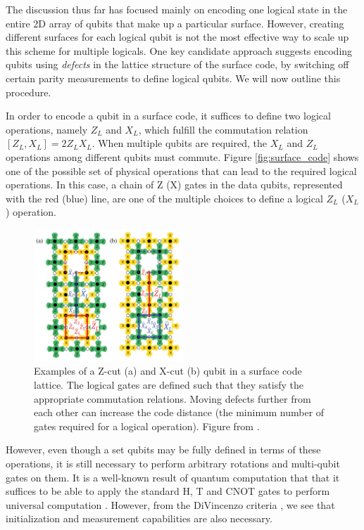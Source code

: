The discussion thus far has focused mainly on encoding one logical state in the
entire 2D array of qubits that make up a particular surface. However, creating
different surfaces for each logical qubit is not the most effective way to
scale up this scheme for multiple logicals. One key candidate approach suggests
encoding qubits using \textit{defects} in the lattice structure of the surface
code, by switching off certain parity measurements to define logical qubits. We
will now outline this procedure.

In order to encode a qubit in a surface code, it suffices to define two logical
operations, namely $Z_L$ and $X_L$, which fulfill the commutation relation
$[Z_L,X_L] = 2Z_LX_L$. When multiple qubits are required, the $X_L$ and $Z_L$
operations among different qubits must commute. Figure \ref{fig:surface_code}
shows one of the possible set of physical operations that can lead to the
required logical operations. In this case, a chain of Z (X) gates in the data
qubits, represented with the red (blue) line, are one of the multiple choices to
define a logical $Z_L$ ($X_L$) operation.

\begin{figure}[htbp]
  \centering
  \includegraphics[width=0.5\textwidth]{images/surface_code_cuts.pdf}
  \caption{Examples of a Z-cut (a) and X-cut (b) qubit in a surface code
    lattice. The logical gates are defined such that they satisfy the
    appropriate commutation relations. Moving defects further from each other
    can increase the code distance (the minimum number of gates required for a
    logical operation). Figure from \cite{fowler12_surfac_codes}.}
  \label{fig:cuts}
\end{figure}

However, even though a set qubits may be fully defined in terms of these
operations, it is still necessary to perform arbitrary rotations and multi-qubit
gates on them. It is a well-known result of quantum computation that that it
suffices to be able to apply the standard H, T and CNOT gates to perform
universal computation \cite{nielsen_chuang_2010}. However, from the DiVincenzo
criteria \cite{DiCincenzoCriteria}, we see that initialization and
measurement capabilities are also necessary.


